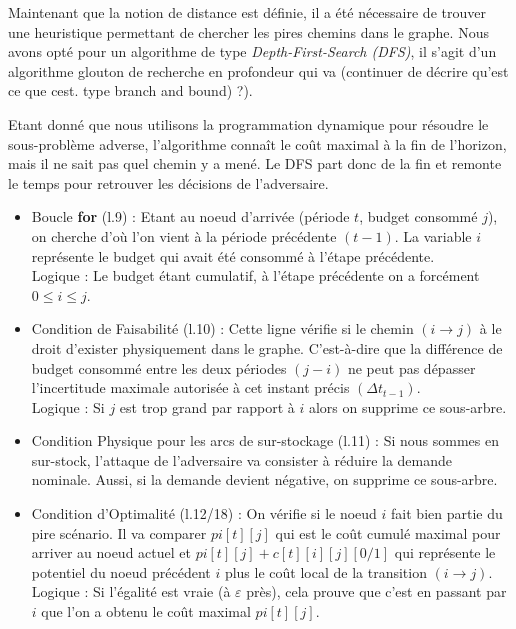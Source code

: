 \documentclass[12pt, a4paper, twoside]{report}
\numberwithin{equation}{section}
\renewcommand{\epsilon}{\varepsilon}
\begin{document}
	Maintenant que la notion de distance est définie, il a été nécessaire de trouver une heuristique permettant de chercher les pires chemins dans le graphe. Nous avons opté pour un algorithme de type \textit{Depth-First-Search (DFS)}, il s'agit d'un algorithme glouton de recherche en profondeur qui va (continuer de décrire qu'est ce que cest. type branch and bound) ?).
	
	Etant donné que nous utilisons la programmation dynamique pour résoudre le sous-problème adverse, l'algorithme connaît le coût maximal à la fin de l'horizon, mais il ne sait pas quel chemin y a mené. Le DFS part donc de la fin et remonte le temps pour retrouver les décisions de l'adversaire. 
	
	\begin{itemize}
		\item Boucle \textbf{for} (l.9) : Etant au noeud d'arrivée (période $t$, budget consommé $j$), on cherche d'où l'on vient à la période précédente $(t-1)$. La variable $i$ représente le budget qui avait été consommé à l'étape précédente.\\
		Logique : Le budget étant cumulatif, à l'étape précédente on a forcément $0\leq i\leq j$.
		\item Condition de Faisabilité (l.10) : Cette ligne vérifie si le chemin $(i\rightarrow j)$ à le droit d'exister physiquement dans le graphe. C'est-à-dire que la différence de budget consommé entre les deux périodes $(j-i)$ ne peut pas dépasser l'incertitude maximale autorisée à cet instant précis $(\Delta t_{t-1})$.\\
		Logique : Si $j$ est trop grand par rapport à $i$ alors on supprime ce sous-arbre.
		\item Condition Physique pour les arcs de sur-stockage (l.11) : Si nous sommes en sur-stock, l'attaque de l'adversaire va consister à réduire la demande nominale. Aussi, si la demande devient négative, on supprime ce sous-arbre.
		\item Condition d'Optimalité (l.12/18) : On vérifie si le noeud $i$ fait bien partie  du pire scénario. Il va comparer $pi[t][j]$ qui est le coût cumulé maximal pour arriver au noeud actuel et $pi[t][j] + c[t][i][j][0/1]$ qui représente le potentiel du noeud précédent $i$ plus le coût local de la transition $(i\rightarrow j)$.\\
		Logique : Si l'égalité est vraie (à $\epsilon$ près), cela prouve que c'est en passant par $i$ que l'on a obtenu le coût maximal $pi[t][j]$.
	\end{itemize}
	
\end{document}
